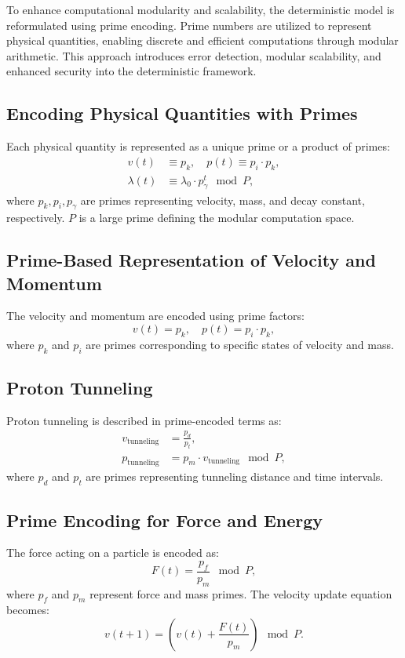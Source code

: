 \documentclass{article}
\theoremstyle{plain}
\begin{document}
To enhance computational modularity and scalability, the deterministic model is reformulated using prime encoding. Prime numbers are utilized to represent physical quantities, enabling discrete and efficient computations through modular arithmetic. This approach introduces error detection, modular scalability, and enhanced security into the deterministic framework.

\subsection{Encoding Physical Quantities with Primes}
Each physical quantity is represented as a unique prime or a product of primes:
\begin{align}
v(t) &\equiv p_k, \quad p(t) \equiv p_i \cdot p_k, \\
\lambda(t) &\equiv \lambda_0 \cdot p_\gamma^t \mod P,
\end{align}
where \(p_k, p_i, p_\gamma\) are primes representing velocity, mass, and decay constant, respectively. \(P\) is a large prime defining the modular computation space.

\subsection{Prime-Based Representation of Velocity and Momentum}
The velocity and momentum are encoded using prime factors:
\begin{equation}
v(t) = p_k, \quad p(t) = p_i \cdot p_k,
\end{equation}
where \(p_k\) and \(p_i\) are primes corresponding to specific states of velocity and mass.

\subsection{Proton Tunneling}
Proton tunneling is described in prime-encoded terms as:
\begin{align}
v_{\text{tunneling}} &= \frac{p_d}{p_t}, \\
p_{\text{tunneling}} &= p_m \cdot v_{\text{tunneling}} \mod P,
\end{align}
where \(p_d\) and \(p_t\) are primes representing tunneling distance and time intervals.

\subsection{Prime Encoding for Force and Energy}
The force acting on a particle is encoded as:
\begin{equation}
F(t) = \frac{p_f}{p_m} \mod P,
\end{equation}
where \(p_f\) and \(p_m\) represent force and mass primes. The velocity update equation becomes:
\begin{equation}
v(t+1) = \left( v(t) + \frac{F(t)}{p_m} \right) \mod P.
\end{equation}
\end{document}
